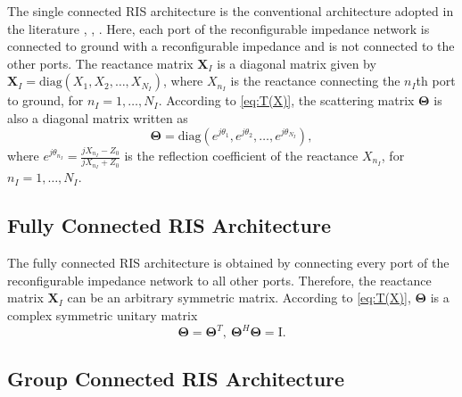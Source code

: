 \documentclass[twocolumn,10pt]{IEEEtran}
\begin{document}
The single connected RIS architecture is the conventional architecture adopted in the literature \cite{bas19}, \cite{wu19a}, \cite{liu21}.
Here, each port of the reconfigurable impedance network is connected to ground with a reconfigurable impedance and is not connected to the other ports.
The reactance matrix $\mathbf{X}_{I}$ is a diagonal matrix given by $\mathbf{X}_{I}=\mathrm{diag}\left(X_{1},X_{2},\ldots,X_{N_{I}}\right)$, where $X_{n_{I}}$ is the reactance connecting the $n_{I}$th port to ground, for $n_{I}=1,\ldots,N_{I}$.
According to \eqref{eq:T(X)}, the scattering matrix $\boldsymbol{\Theta}$ is also a diagonal matrix written as
\begin{equation}
\boldsymbol{\Theta}=\mathrm{diag}\left(e^{j\theta_{1}},e^{j\theta_{2}},\ldots,e^{j\theta_{N_{I}}}\right),\label{eq:diag(T)}
\end{equation}
where $e^{j\theta_{n_{I}}}=\frac{jX_{n_{I}}-Z_{0}}{jX_{n_{I}}+Z_{0}}$ is the reflection coefficient of the reactance $X_{n_{I}}$, for $n_{I}=1,\ldots,N_{I}$.

\subsection{Fully Connected RIS Architecture}

The fully connected RIS architecture is obtained by connecting every port of the reconfigurable impedance network to all other ports.
Therefore, the reactance matrix $\mathbf{X}_{I}$ can be an arbitrary symmetric matrix.
According to \eqref{eq:T(X)}, $\boldsymbol{\Theta}$ is a complex symmetric unitary matrix
\begin{equation}
\boldsymbol{\Theta}=\boldsymbol{\Theta}^{T},\:\boldsymbol{\Theta}^{H}\boldsymbol{\Theta}=\boldsymbol{\mathrm{I}}.\label{eq:T fully}
\end{equation}

\subsection{Group Connected RIS Architecture}
\end{document}
